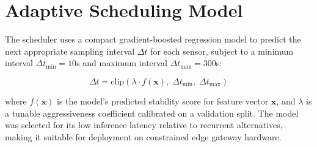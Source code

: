 \section{Adaptive Scheduling Model}

The scheduler uses a compact gradient-boosted regression model to predict the next appropriate
sampling interval $\Delta t$ for each sensor, subject to a minimum interval $\Delta t_{\min}=10$s
and maximum interval $\Delta t_{\max}=300$s:

\begin{equation}
\Delta t = \mathrm{clip}\left(\lambda \cdot f(\mathbf{x}), \; \Delta t_{\min}, \; \Delta t_{\max}\right)
\label{eq:scheduler}
\end{equation}

\noindent where $f(\mathbf{x})$ is the model's predicted stability score for feature vector
$\mathbf{x}$, and $\lambda$ is a tunable aggressiveness coefficient calibrated on a validation
split. The model was selected for its low inference latency relative to recurrent alternatives,
making it suitable for deployment on constrained edge gateway hardware.
